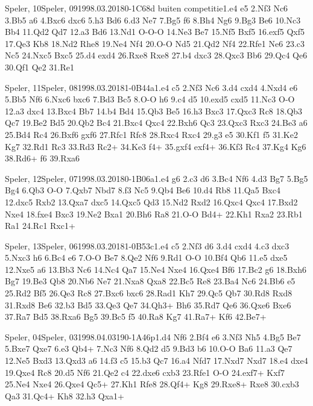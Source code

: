 \documentclass[twocolumn,a4paper,10pt]{report}
\begin{document}
\begin{chessgame}{Speler, 10}{Speler, 09}{1998.03.20}{18}{0-1}{C68d buiten competitie}{1.e4 e5 2.Nf3 Nc6 3.Bb5 a6 4.Bxc6 dxc6 5.h3 Bd6 6.d3 Ne7 7.Bg5 f6 8.Bh4 Ng6 9.Bg3 Be6 10.Nc3 Bb4 11.Qd2 Qd7 12.a3 Bd6 13.Nd1 O-O-O 14.Ne3 Be7 15.Nf5 Bxf5 16.exf5 Qxf5 17.Qe3 Kb8 18.Nd2 Rhe8 19.Ne4 Nf4 20.O-O Nd5 21.Qd2 Nf4 22.Rfe1 Ne6 23.c3 Nc5 24.Nxc5 Bxc5 25.d4 exd4 26.Rxe8 Rxe8 27.b4 dxc3 28.Qxc3 Bb6 29.Qc4 Qe6 30.Qf1 Qe2 31.Re1}\end{chessgame}
\begin{chessgame}{Speler, 11}{Speler, 08}{1998.03.20}{18}{1-0}{B44a}{1.e4 c5 2.Nf3 Nc6 3.d4 cxd4 4.Nxd4 e6 5.Bb5 Nf6 6.Nxc6 bxc6 7.Bd3 Bc5 8.O-O h6 9.c4 d5 10.exd5 cxd5 11.Nc3 O-O 12.a3 dxc4 13.Bxc4 Bb7 14.b4 Bd4 15.Qb3 Be5 16.h3 Bxc3 17.Qxc3 Rc8 18.Qb3 Qc7 19.Be2 Bd5 20.Qb2 Bc4 21.Bxc4 Qxc4 22.Bxh6 Qc3 23.Qxc3 Rxc3 24.Be3 a6 25.Bd4 Rc4 26.Bxf6 gxf6 27.Rfc1 Rfc8 28.Rxc4 Rxc4 29.g3 e5 30.Kf1 f5 31.Ke2 Kg7 32.Rd1 Rc3 33.Rd3 Rc2+ 34.Ke3 f4+ 35.gxf4 exf4+ 36.Kf3 Rc4 37.Kg4 Kg6 38.Rd6+ f6 39.Rxa6}\end{chessgame}
\begin{chessgame}{Speler, 12}{Speler, 07}{1998.03.20}{18}{0-1}{B06a}{1.e4 g6 2.c3 d6 3.Bc4 Nf6 4.d3 Bg7 5.Bg5 Bg4 6.Qb3 O-O 7.Qxb7 Nbd7 8.f3 Nc5 9.Qb4 Be6 10.d4 Rb8 11.Qa5 Bxc4 12.dxc5 Rxb2 13.Qxa7 dxc5 14.Qxc5 Qd3 15.Nd2 Rxd2 16.Qxc4 Qxc4 17.Bxd2 Nxe4 18.fxe4 Bxc3 19.Ne2 Bxa1 20.Bh6 Ra8 21.O-O Bd4+ 22.Kh1 Rxa2 23.Rb1 Ra1 24.Rc1 Rxc1+}\end{chessgame}
\begin{chessgame}{Speler, 13}{Speler, 06}{1998.03.20}{18}{1-0}{B53c}{1.e4 c5 2.Nf3 d6 3.d4 cxd4 4.c3 dxc3 5.Nxc3 h6 6.Bc4 e6 7.O-O Be7 8.Qe2 Nf6 9.Rd1 O-O 10.Bf4 Qb6 11.e5 dxe5 12.Nxe5 a6 13.Bb3 Nc6 14.Nc4 Qa7 15.Ne4 Nxe4 16.Qxe4 Bf6 17.Bc2 g6 18.Bxh6 Bg7 19.Be3 Qb8 20.Nb6 Ne7 21.Nxa8 Qxa8 22.Bc5 Re8 23.Ba4 Nc6 24.Bb6 e5 25.Rd2 Bf5 26.Qe3 Rc8 27.Bxc6 bxc6 28.Rad1 Kh7 29.Qc5 Qb7 30.Rd8 Rxd8 31.Rxd8 Be6 32.b3 Bd5 33.Qe3 Qe7 34.Qh3+ Bh6 35.Rd7 Qe6 36.Qxe6 Bxe6 37.Ra7 Bd5 38.Rxa6 Bg5 39.Bc5 f5 40.Ra8 Kg7 41.Ra7+ Kf6 42.Be7+}\end{chessgame}
\begin{chessgame}{Speler, 04}{Speler, 03}{1998.04.03}{19}{0-1}{A46p}{1.d4 Nf6 2.Bf4 e6 3.Nf3 Nh5 4.Bg5 Be7 5.Bxe7 Qxe7 6.e3 Qb4+ 7.Nc3 Nf6 8.Qd2 d5 9.Bd3 b6 10.O-O Ba6 11.a3 Qe7 12.Ne5 Bxd3 13.Qxd3 a6 14.f3 c5 15.b3 Qc7 16.a4 Nfd7 17.Nxd7 Nxd7 18.e4 dxe4 19.Qxe4 Rc8 20.d5 Nf6 21.Qe2 c4 22.dxe6 cxb3 23.Rfe1 O-O 24.exf7+ Kxf7 25.Ne4 Nxe4 26.Qxe4 Qc5+ 27.Kh1 Rfe8 28.Qf4+ Kg8 29.Rxe8+ Rxe8 30.cxb3 Qa3 31.Qc4+ Kh8 32.h3 Qxa1+}\end{chessgame}
\end{document}
